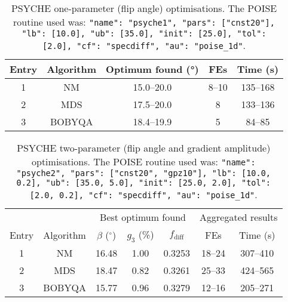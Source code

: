 \begin{table}
    \centering
    \begin{tabular}{ccccc}
        \toprule
       Entry & Algorithm & Optimum found (\unit{\degree}) & FEs   & Time (\unit{\s}) \\
        \midrule
        1     & NM        & 15.0--20.0                   & 8--10 & 135--168             \\
        2     & MDS       & 17.5--20.0                   & 8     & 133--136             \\
        3     & BOBYQA    & 18.4--19.9                   & 5     & 84--85               \\
        \bottomrule
    \end{tabular}
    \caption[PSYCHE one-parameter optimisations]{
        PSYCHE one-parameter (flip angle) optimisations.
        The POISE routine used was: \texttt{{"name": "psyche1", "pars": ["cnst20"], "lb": [10.0], "ub": [35.0], "init": [25.0], "tol": [2.0], "cf": "specdiff", "au": "poise_1d"}}.
    }
    \label{tbl:poise_psyche1p}
\end{table}

\begin{table}
    \centering
    \begin{tabular}{ccccccc}
        \toprule
              &           & \multicolumn{3}{c}{Best optimum found}            & \multicolumn{2}{c}{Aggregated results} \\
                            \cmidrule(lr){3-5}                                  \cmidrule(lr){6-7}
        Entry & Algorithm & $\beta$ ($^\circ$) & $g_3$ (\%) & $f_\text{diff}$ & FEs    & Time (\unit{\s}) \\
        \midrule
        1     & NM        & 16.48              & 1.00       & 0.3253          & 18--24 & 307--410             \\
        2     & MDS       & 18.47              & 0.82       & 0.3261          & 25--33 & 424--565             \\
        3     & BOBYQA    & 15.77              & 0.96       & 0.3279          & 12--16 & 205--271             \\
        \bottomrule
    \end{tabular}
    \caption[PSYCHE two-parameter optimisations]{
        PSYCHE two-parameter (flip angle and gradient amplitude) optimisations.
        The POISE routine used was: \texttt{{"name": "psyche2", "pars": ["cnst20", "gpz10"], "lb": [10.0, 0.2], "ub": [35.0, 5.0], "init": [25.0, 2.0], "tol": [2.0, 0.2], "cf": "specdiff", "au": "poise_1d"}}.
    }
    \label{tbl:poise_psyche2p}
\end{table}

